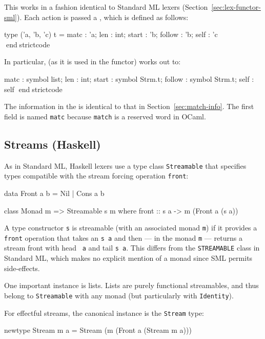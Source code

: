 \documentclass[10pt]{article}
\begin{document}
\begin{strictcode}
\begin{strictcode}
This works in a fashion identical to Standard ML lexers
(Section~\ref{sec:lex-functor-sml}).  Each action is passed a 
, which is defined as follows:

\begin{strictcode}
type ('a, 'b, 'c) t =
   { matc : 'a;
     len : int;
     start : 'b;
     follow : 'b;
     self : 'c }
endstrictcode

In particular,  (as
it is used in the functor) works out to:

\begin{strictcode}
   { matc : symbol list;
     len : int;
     start : symbol Strm.t;
     follow : symbol Strm.t;
     self : self }
endstrictcode

The information in the  is identical to that in
Section~\ref{sec:match-info}.  The first field is named {\tt matc}
because {\tt match} is a reserved word in OCaml.




\subsection{Streams (Haskell)}

As in Standard ML, Haskell lexers use a type class {\tt Streamable} that
specifies types compatible with the stream forcing operation {\tt front}:

\begin{code}
data Front a b =
   Nil 
 | Cons a b

class Monad m => Streamable s m where
   front :: s a -> m (Front a (s a))
\end{code}


A type constructor {\tt s} is streamable (with an associated monad
{\tt m}) if it provides a {\tt front} operation that takes an {\tt s
a} and then --- in the monad {\tt m} --- returns a stream front with head {\tt
a} and tail {\tt s a}.  This differs from the {\tt STREAMABLE} class
in Standard ML, which makes no explicit mention of a monad since SML
permits side-effects.

One important instance is lists.  Lists are purely functional
streamables, and thus belong to {\tt Streamable} with any monad (but
particularly with {\tt Identity}).

For effectful streams, the canonical instance is the {\tt Stream} type:

\begin{code}
newtype Stream m a =
   Stream (m (Front a (Stream m a)))
\end{code}


\end{strictcode}
\end{strictcode}
\end{strictcode}
\end{strictcode}
\end{document}
